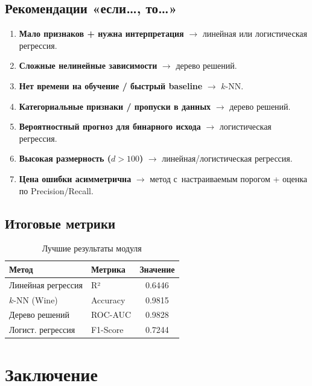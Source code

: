 \documentclass[12pt,a4paper]{article}
\begin{document}
\subsection{Рекомендации «если…, то…»}

\begin{enumerate}
    \item \textbf{Мало признаков + нужна интерпретация}
          \(\rightarrow\) линейная или логистическая регрессия.
    \item \textbf{Сложные нелинейные зависимости}
          \(\rightarrow\) дерево решений.
    \item \textbf{Нет времени на обучение / быстрый baseline}
          \(\rightarrow\) \(k\)-NN.
    \item \textbf{Категориальные признаки / пропуски в данных}
          \(\rightarrow\) дерево решений.
    \item \textbf{Вероятностный прогноз для бинарного исхода}
          \(\rightarrow\) логистическая регрессия.
    \item \textbf{Высокая размерность (\(d > 100\))}
          \(\rightarrow\) линейная/логистическая регрессия.
    \item \textbf{Цена ошибки асимметрична} \(\rightarrow\) метод
          с~настраиваемым порогом + оценка по Precision/Recall.
\end{enumerate}

\subsection{Итоговые метрики}

\begin{table}[H]\centering
\caption{Лучшие результаты модуля}\label{tab:final-all}
\begin{tabular}{llc}\toprule
Метод & Метрика & Значение \\ \midrule
Линейная регрессия  & R² & 0.6446 \\
\(k\)-NN (Wine)     & Accuracy & 0.9815 \\
Дерево решений      & ROC-AUC & 0.9828 \\
Логист. регрессия   & F1-Score & 0.7244 \\ \bottomrule
\end{tabular}
\end{table}

\newpage

\section{Заключение}
\end{document}
